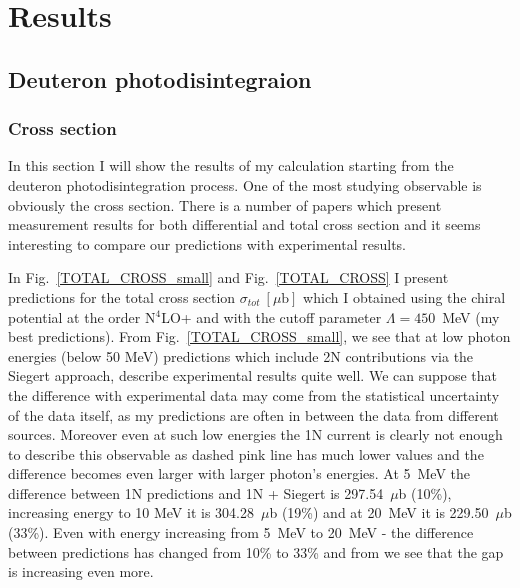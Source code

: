 \chapter{Results}

\section{Deuteron photodisintegraion}

    \subsection{Cross section}
    \label{cross_results}

    In this section I will show the results of my calculation starting from the
    deuteron photodisintegration process. One of the most
    studying observable is obviously the cross section. There is
    a number of papers which present 
    measurement results for both differential and total cross section
    \cite{BOSMAN1979,ARENDS1984,Skopik1974, Moreh1989, Birenbaum1985, Bernabei1986, rachek2007,Ying_Experiment_Deut, DeSanctis_Experiment_Deut} 
    and it seems interesting to compare 
    our predictions with experimental results.

    In Fig.~\ref{TOTAL_CROSS_small} and Fig.~\ref{TOTAL_CROSS} 
    I present predictions for the
    total cross section $\sigma_{tot}~[\mu\text{b}]$ which I obtained
    using the chiral potential at the order N$^4$LO+ and with 
    the cutoff parameter $\Lambda=450$~MeV (my best predictions).
    From Fig.~\ref{TOTAL_CROSS_small}, we see that at low photon energies
    (below 50 MeV) predictions which include 2N contributions
    via the Siegert approach, describe experimental results quite well.
    We can suppose that the difference with experimental data may come from 
    the statistical uncertainty of  the data itself, as my predictions
    are often in between the data from different sources.
    Moreover even at such low energies the 1N current is clearly not enough
    to describe this observable as dashed pink line has much lower values and
    the difference becomes even larger with larger photon's energies.
    At 5~MeV the difference between 1N predictions
    and 1N + Siegert is 297.54~$\mu$b (10\%), increasing energy to 10 MeV
    it is 304.28~$\mu$b (19\%) and at 20~MeV it is 229.50~$\mu$b (33\%).
    Even with energy increasing from 5~MeV to 20~MeV -
    the difference between predictions has changed from 10\% to 33\% and
    from  we see that the gap is increasing even more.

